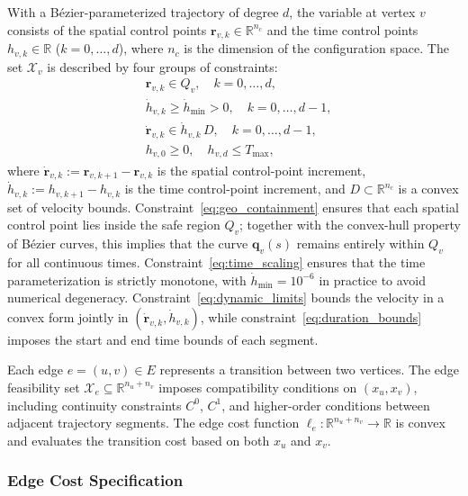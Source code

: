With a Bézier-parameterized trajectory of degree $d$, the variable at vertex $v$
consists of the spatial control points $\mathbf{r}_{v,k} \in \mathbb{R}^{n_c}$ and
the time control points $h_{v,k} \in \mathbb{R}$ ($k = 0, \ldots, d$), where $n_c$
is the dimension of the configuration space. The set $\mathcal{X}_v$ is described
by four groups of constraints:
\begin{align}
   & \mathbf{r}_{v,k} \in Q_v,
  \quad k = 0, \ldots, d,
  \label{eq:geo_containment}                       \\
   & \dot{h}_{v,k} \ge \dot{h}_{\min} > 0,
  \quad k = 0, \ldots, d-1,
  \label{eq:time_scaling}                          \\
   & \dot{\mathbf{r}}_{v,k} \in \dot{h}_{v,k}\, D,
  \quad k = 0, \ldots, d-1,
  \label{eq:dynamic_limits}                        \\
   & h_{v,0} \ge 0,
  \quad h_{v,d} \le T_{\max},
  \label{eq:duration_bounds}
\end{align}
where $\dot{\mathbf{r}}_{v,k} := \mathbf{r}_{v,k+1} - \mathbf{r}_{v,k}$ is the
spatial control-point increment, $\dot{h}_{v,k} := h_{v,k+1} - h_{v,k}$ is the
time control-point increment, and $D \subset \mathbb{R}^{n_c}$ is a convex set of
velocity bounds.
Constraint~\eqref{eq:geo_containment} ensures that each spatial control point lies
inside the safe region $Q_v$; together with the convex-hull property of Bézier
curves, this implies that the curve $\mathbf{q}_v(s)$ remains entirely within $Q_v$
for all continuous times.
Constraint~\eqref{eq:time_scaling} ensures that the time parameterization is
strictly monotone, with $\dot{h}_{\min} = 10^{-6}$ in practice to avoid numerical
degeneracy.
Constraint~\eqref{eq:dynamic_limits} bounds the velocity in a convex form jointly
in $(\dot{\mathbf{r}}_{v,k}, \dot{h}_{v,k})$, while constraint~\eqref{eq:duration_bounds}
imposes the start and end time bounds of each segment.

Each edge $e = (u, v) \in E$ represents a transition between two vertices. The
edge feasibility set $\mathcal{X}_e \subseteq \mathbb{R}^{n_u + n_v}$ imposes
compatibility conditions on $(x_u, x_v)$, including continuity constraints $C^0$,
$C^1$, and higher-order conditions between adjacent trajectory segments. The edge
cost function $\ell_e \colon \mathbb{R}^{n_u + n_v} \to \mathbb{R}$ is convex and
evaluates the transition cost based on both $x_u$ and $x_v$.

\subsubsection{Edge Cost Specification}
\label{subsubsec:gcs_cost}

